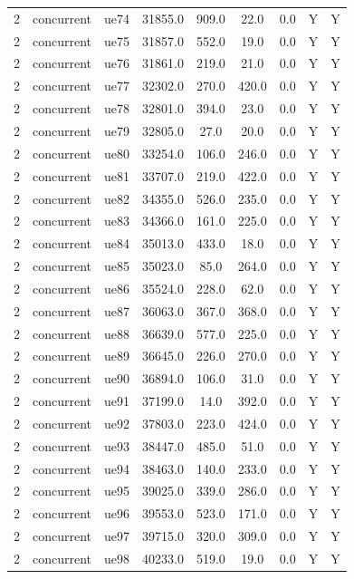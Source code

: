 \begin{table}[ht]
\begin{tabular}{|c|c|c|c|c|c|c|c|c|}
2 & concurrent & ue74 & 31855.0 & 909.0 & 22.0 & 0.0 & Y & Y \\
2 & concurrent & ue75 & 31857.0 & 552.0 & 19.0 & 0.0 & Y & Y \\
2 & concurrent & ue76 & 31861.0 & 219.0 & 21.0 & 0.0 & Y & Y \\
2 & concurrent & ue77 & 32302.0 & 270.0 & 420.0 & 0.0 & Y & Y \\
2 & concurrent & ue78 & 32801.0 & 394.0 & 23.0 & 0.0 & Y & Y \\
2 & concurrent & ue79 & 32805.0 & 27.0 & 20.0 & 0.0 & Y & Y \\
2 & concurrent & ue80 & 33254.0 & 106.0 & 246.0 & 0.0 & Y & Y \\
2 & concurrent & ue81 & 33707.0 & 219.0 & 422.0 & 0.0 & Y & Y \\
2 & concurrent & ue82 & 34355.0 & 526.0 & 235.0 & 0.0 & Y & Y \\
2 & concurrent & ue83 & 34366.0 & 161.0 & 225.0 & 0.0 & Y & Y \\
2 & concurrent & ue84 & 35013.0 & 433.0 & 18.0 & 0.0 & Y & Y \\
2 & concurrent & ue85 & 35023.0 & 85.0 & 264.0 & 0.0 & Y & Y \\
2 & concurrent & ue86 & 35524.0 & 228.0 & 62.0 & 0.0 & Y & Y \\
2 & concurrent & ue87 & 36063.0 & 367.0 & 368.0 & 0.0 & Y & Y \\
2 & concurrent & ue88 & 36639.0 & 577.0 & 225.0 & 0.0 & Y & Y \\
2 & concurrent & ue89 & 36645.0 & 226.0 & 270.0 & 0.0 & Y & Y \\
2 & concurrent & ue90 & 36894.0 & 106.0 & 31.0 & 0.0 & Y & Y \\
2 & concurrent & ue91 & 37199.0 & 14.0 & 392.0 & 0.0 & Y & Y \\
2 & concurrent & ue92 & 37803.0 & 223.0 & 424.0 & 0.0 & Y & Y \\
2 & concurrent & ue93 & 38447.0 & 485.0 & 51.0 & 0.0 & Y & Y \\
2 & concurrent & ue94 & 38463.0 & 140.0 & 233.0 & 0.0 & Y & Y \\
2 & concurrent & ue95 & 39025.0 & 339.0 & 286.0 & 0.0 & Y & Y \\
2 & concurrent & ue96 & 39553.0 & 523.0 & 171.0 & 0.0 & Y & Y \\
2 & concurrent & ue97 & 39715.0 & 320.0 & 309.0 & 0.0 & Y & Y \\
2 & concurrent & ue98 & 40233.0 & 519.0 & 19.0 & 0.0 & Y & Y \\

\end{tabular}
\end{table}
